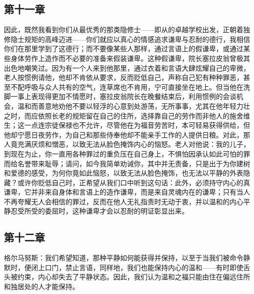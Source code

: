 
\subsection{第十一章}

\par

因此，既然我看到你们从最优秀的那类隐修士——即从的卓越学校出发，正朝着独修隐士规矩的高峰迈进——你们就应以真心的情感追求谦卑与忍耐的德行，我相信你们在那里学到了这德行；而不要像某些人那样，通过言语上的假谦卑，或通过某些身体劳作上造作而不必要的准备来假装谦卑。这种假谦卑，院长塞拉皮翁曾极其出色地嘲笑过。因为有一个人来到他那里，通过衣着和言语大肆炫耀自己的卑微，老人按惯例请他，他却不肯依从要求，反而贬低自己，声称自己犯有种种罪恶，甚至不配呼吸与众人共有的空气，连草席也不肯用，宁可直接坐在地上。但当他在洗脚一事上表现得更加不情愿时，塞拉皮翁院长在晚餐结束后，利用惯例的会谈机会，温和而善意地劝他不要以轻浮的心意到处游荡，无所事事，尤其在他年轻力壮之时，而应依照长老的规矩留在自己的住所，选择靠自己的劳作而非他人的施舍维生；这一点连宗徒保禄也不允许，尽管他在为福音劳苦时，本可轻易获得供给，但他却宁愿日夜劳作，为自己和那些侍奉他却不能亲手工作的人提供日粮。对此，那人竟充满厌烦和憎恶，以致无法从脸色掩饰内心的恼怒。老人对他说：我的儿子，到现在为止，你一直用各种罪过的重负压在自己身上，不惧怕因承认如此可怕的罪而给名誉带来耻辱；请问，如今我简单劝诫你，其中并无责备，只是出于为你建树和爱德的感受，为何你竟如此恼怒，以致无法从脸色掩饰，也无法以平静的外表隐藏？或许你贬低自己时，正希望从我们口中听到这句话：此外，必须持守内心的真谦卑，它并非来自身体和言语上的造作谦卑，而是来自灵魂内在的谦卑；只有当人不再夸耀无人会相信的罪过，反而在他人无礼指责时无动于衷，并以温和的内心平静忍受所受的委屈时，这种谦卑才会以忍耐的明证彰显出来。\par


\subsection{第十二章}

\par

格尔马努斯：我们希望知道，那种平静如何能获得并保持，以至于当我们被命令静默时，便闭上口门，禁止言语，同样地，我们也能保持内心的温和——有时即使舌头被约束，内心却失去了平静状态。因此，我们认为温和之福只能由住在偏远住所和独居处的人才能保持。\par

